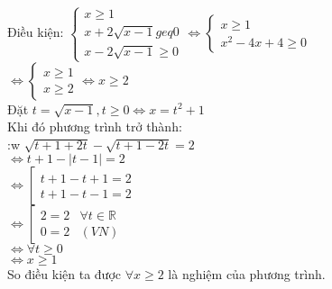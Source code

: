 \begin{Answer}{9}
Điều kiện: $ \begin{cases}
    x \geq 1 \\
    x + 2 \sqrt{x-1 } geq 0 \\
    x - 2 \sqrt{x -1 } \geq 0
\end{cases} \Leftrightarrow
\begin{cases}
    x \geq 1 \\
    x^2 -4x + 4 \geq 0
\end{cases} $ \\
$ \Leftrightarrow \begin{cases}
    x \geq 1 \\
    x \geq 2
\end{cases} \Leftrightarrow x \geq 2
$\\
Đặt $ t = \sqrt{x-1 } , t \geq 0 \Leftrightarrow x= t^2 +1 $ \\
Khi đó phương trình trở thành: \\:w
$ \sqrt{t+1 +2t } - \sqrt{t+1 -2t } =2 $ \\
$ \Leftrightarrow t + 1 - | t -1 | =2 $ \\
$ \Leftrightarrow \left[
    \begin{array}{l}
        t + 1 - t + 1 =2  \\
        t + 1 -t -1 =2
    \end{array}
\right. $ \\
$ \Leftrightarrow \left[
    \begin{array}{lr}
        2 = 2 & \forall t \in \mathbb{R} \\
        0=2 & (VN)
    \end{array}
\right. $ \\
$ \Leftrightarrow \forall t \geq 0 $\\
$ \Leftrightarrow x \geq 1 $ \\
So điều kiện ta được $ \forall  x \geq 2 $ là nghiệm của phương trình.


\end{Answer}
\begin{Answer}{10}

\end{Answer}
\begin{Answer}{11}

\end{Answer}
\begin{Answer}{12}

\end{Answer}
\begin{Answer}{13}

\end{Answer}
\begin{Answer}{14}

\end{Answer}
\begin{Answer}{15}

\end{Answer}
\begin{Answer}{16}

\end{Answer}
\begin{Answer}{17}

\end{Answer}
\begin{Answer}{18}

\end{Answer}
\begin{Answer}{19}

\end{Answer}
